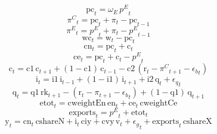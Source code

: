 \begin{dmath}
{{\mathrm{pc}}}_{t}={{\omega_{E}}}\, {{p^{E}}}_{t}
\end{dmath}
\begin{dmath}
{{\pi^{C}}}_{t}={{\mathrm{pc}}}_{t}+{{\pi}}_{t}-{{\mathrm{pc}}}_{t-1}
\end{dmath}
\begin{dmath}
{{\pi^{E}}}_{t}={{p^{E}}}_{t}+{{\pi}}_{t}-{{p^{E}}}_{t-1}
\end{dmath}
\begin{dmath}
{{\mathrm{wc}}}_{t}={{\mathrm{w}}}_{t}-{{\mathrm{pc}}}_{t}
\end{dmath}
\begin{dmath}
{{\mathrm{cn}}}_{t}={{\mathrm{pc}}}_{t}+{{\mathrm{c}}}_{t}
\end{dmath}
\begin{dmath}
{{\mathrm{ce}}}_{t}={{\mathrm{pc}}}_{t}+{{\mathrm{c}}}_{t}-{{p^{E}}}_{t}
\end{dmath}
\begin{dmath}
{{\mathrm{c}}}_{t}={{\mathrm{c1}}}\, {{\mathrm{c}}}_{t+1}+\left(1-{{\mathrm{c1}}}\right)\, {{\mathrm{c}}}_{t-1}-{{\mathrm{c2}}}\, \left({{\mathrm{r}}}_{t}-{{\pi^{C}}}_{t+1}-{{\epsilon_{b}}}_{t}\right)
\end{dmath}
\begin{dmath}
{{\mathrm{i}}}_{t}={{\mathrm{i1}}}\, {{\mathrm{i}}}_{t-1}+\left(1-{{\mathrm{i1}}}\right)\, {{\mathrm{i}}}_{t+1}+{{\mathrm{i2}}}\, {{\mathrm{q}}}_{t}+{{\epsilon_{q}}}_{t}
\end{dmath}
\begin{dmath}
{{\mathrm{q}}}_{t}={{\mathrm{q1}}}\, {{\mathrm{rk}}}_{t+1}-\left({{\mathrm{r}}}_{t}-{{\pi}}_{t+1}-{{\epsilon_{b}}}_{t}\right)+\left(1-{{\mathrm{q1}}}\right)\, {{\mathrm{q}}}_{t+1}
\end{dmath}
\begin{dmath}
{{\mathrm{etot}}}_{t}={{\mathrm{cweightEn}}}\, {{\mathrm{en}}}_{t}+{{\mathrm{ce}}}_{t}\, {{\mathrm{cweightCe}}}
\end{dmath}
\begin{dmath}
{{\mathrm{exports}}}_{t}={{p^{E}}}_{t}+{{\mathrm{etot}}}_{t}
\end{dmath}
\begin{dmath}
{{\mathrm{y}}}_{t}={{\mathrm{cn}}}_{t}\, {{\mathrm{cshareN}}}+{{\mathrm{i}}}_{t}\, {{\mathrm{ciy}}}+{{\mathrm{cvy}}}\, {{\mathrm{v}}}_{t}+{{\epsilon_{g}}}_{t}+{{\mathrm{exports}}}_{t}\, {{\mathrm{cshareX}}}
\end{dmath}
